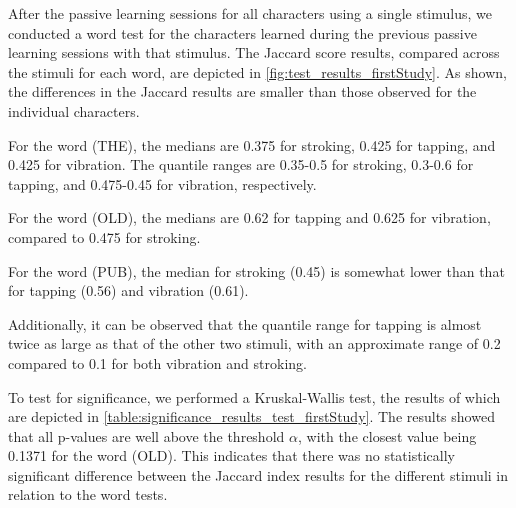 After the passive learning sessions for all characters using a single stimulus, we conducted a word test for the characters learned during the previous passive learning sessions with that stimulus. 
The Jaccard score results, compared across the stimuli for each word, are depicted in \autoref{fig:test_results_firstStudy}. 
As shown, the differences in the Jaccard results are smaller than those observed for the individual characters. 

For the word (THE), the medians are 0.375 for stroking, 0.425 for tapping, and 0.425 for vibration. The quantile ranges are 0.35-0.5 for stroking, 0.3-0.6 for tapping, and 0.475-0.45 for vibration, respectively.

For the word (OLD), the medians are 0.62 for tapping and 0.625 for vibration, compared to 0.475 for stroking.

For the word (PUB), the median for stroking (0.45) is somewhat lower than that for tapping (0.56) and vibration (0.61). 

Additionally, it can be observed that the quantile range for tapping is almost twice as large as that of the other two stimuli, with an approximate range of 0.2 compared to 0.1 for both vibration and stroking.

To test for significance, we performed a Kruskal-Wallis test, the results of which are depicted in \autoref{table:significance_results_test_firstStudy}. 
The results showed that all p-values are well above the threshold $\alpha$, with the closest value being 0.1371 for the word (OLD). 
This indicates that there was no statistically significant difference between the Jaccard index results for the different stimuli in relation to the word tests.

\begin{table}[ht]
\caption{Results of the Kruskal-Wallis significance tests for the wordtests \enquote{THE}, \enquote{OLD}, and \enquote{PUB} with a $\eta^2$ Effect Size.}
\label{table:significance_results_test_firstStudy}
\end{table}



